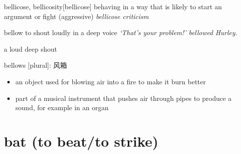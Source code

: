 \begin{DefWord}{bellicose, bellicosity}[bellicose]
    behaving in a way that is likely to start an argument or fight
    (aggressive)
    \textit{bellicose criticism}

\end{DefWord}

\begin{DefWord}{bellow}
    to shout loudly in a deep voice 
    \textit{‘That’s your problem!’ bellowed Hurley.}

    a loud deep shout

    bellows [plural]: 风箱
\begin{itemize}
    \item an object used for blowing air into a fire to make it burn better
    \item part of a musical instrument that pushes air through pipes to produce a sound, for example in an organ
\end{itemize}

\end{DefWord}


\section{bat (to beat/to strike)}

